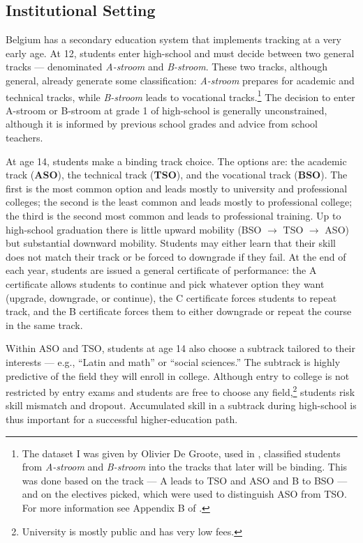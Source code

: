 \documentclass{article}
\begin{document}
\subsection{Institutional Setting}

Belgium has a secondary education system that implements tracking at a very early age. At 12, students enter high-school and must decide between two general tracks --- denominated \textit{A-stroom} and \textit{B-stroom}. These two tracks, although general, already generate some classification: \textit{A-stroom} prepares for academic and technical tracks, while \textit{B-stroom} leads to vocational tracks.\footnote{The dataset I was given by Olivier De Groote, used in \citet{de_groote_dynamic_2025}, classified students from \textit{A-stroom} and \textit{B-stroom} into the tracks that later will be binding. This was done based on the track --- A leads to TSO and ASO and B to BSO --- and on the electives picked, which were used to distinguish ASO from TSO. For more information see Appendix B of \citet{de_groote_dynamic_2025}.} The decision to enter A-stroom or B-stroom at grade 1 of high-school is generally unconstrained, although it is informed by previous school grades and advice from school teachers.

At age 14, students make a binding track choice. The options are: the academic track (\textbf{ASO}), the technical track (\textbf{TSO}), and the vocational track (\textbf{BSO}). The first is the most common option and leads mostly to university and professional colleges; the second is the least common and leads mostly to professional college; the third is the second most common and leads to professional training. Up to high-school graduation there is little upward mobility (BSO $\to$ TSO $\to$ ASO) but substantial downward mobility. Students may either learn that their skill does not match their track or be forced to downgrade if they fail. At the end of each year, students are issued a general certificate of performance: the A certificate allows students to continue and pick whatever option they want (upgrade, downgrade, or continue), the C certificate forces students to repeat track, and the B certificate forces them to either downgrade or repeat the course in the same track.

Within ASO and TSO, students at age 14 also choose a subtrack tailored to their interests --- e.g., ``Latin and math'' or ``social sciences.'' The subtrack is highly predictive of the field they will enroll in college. Although entry to college is not restricted by entry exams and students are free to choose any field,\footnote{University is mostly public and has very low fees.} students risk skill mismatch and dropout. Accumulated skill in a subtrack during high-school is thus important for a successful higher-education path.
\end{document}
